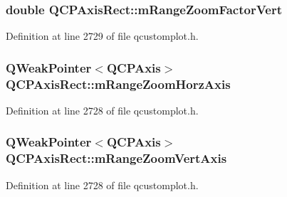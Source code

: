 \hypertarget{class_q_c_p_axis_rect_a32f063629581d5bf82b12769940b34ad}{
\subsubsection[{m\-Range\-Zoom\-Factor\-Vert}]{\setlength{\rightskip}{0pt plus 5cm}double Q\-C\-P\-Axis\-Rect\-::m\-Range\-Zoom\-Factor\-Vert\hspace{0.3cm}{\ttfamily [protected]}}}\label{class_q_c_p_axis_rect_a32f063629581d5bf82b12769940b34ad}


Definition at line 2729 of file qcustomplot.\-h.

\hypertarget{class_q_c_p_axis_rect_aa1ed50c92e235aef88112ce7eef7d252}{
\subsubsection[{m\-Range\-Zoom\-Horz\-Axis}]{\setlength{\rightskip}{0pt plus 5cm}Q\-Weak\-Pointer$<${\bf Q\-C\-P\-Axis}$>$ Q\-C\-P\-Axis\-Rect\-::m\-Range\-Zoom\-Horz\-Axis\hspace{0.3cm}{\ttfamily [protected]}}}\label{class_q_c_p_axis_rect_aa1ed50c92e235aef88112ce7eef7d252}


Definition at line 2728 of file qcustomplot.\-h.

\hypertarget{class_q_c_p_axis_rect_a5ea4480ad5c816cc3c2eed2cd9ed1f4e}{
\subsubsection[{m\-Range\-Zoom\-Vert\-Axis}]{\setlength{\rightskip}{0pt plus 5cm}Q\-Weak\-Pointer$<${\bf Q\-C\-P\-Axis}$>$ Q\-C\-P\-Axis\-Rect\-::m\-Range\-Zoom\-Vert\-Axis\hspace{0.3cm}{\ttfamily [protected]}}}\label{class_q_c_p_axis_rect_a5ea4480ad5c816cc3c2eed2cd9ed1f4e}


Definition at line 2728 of file qcustomplot.\-h.

